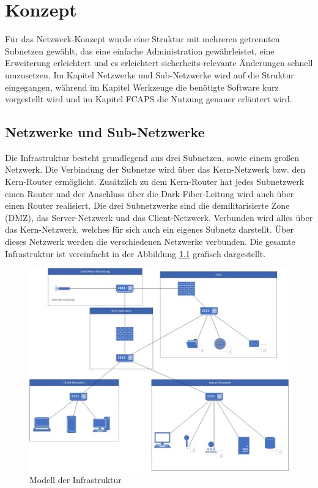 \chapter{Konzept}

Für das Netzwerk-Konzept wurde eine Struktur mit mehreren getrennten Subnetzen gewählt, das eine einfache Administration gewährleistet, eine Erweiterung erleichtert und es erleichtert sicherheits-relevante Änderungen schnell umzusetzen. Im Kapitel Netzwerke und Sub-Netzwerke wird auf die Struktur eingegangen, während im Kapitel Werkzeuge die benötigte Software kurz vorgestellt wird und im Kapitel FCAPS die Nutzung genauer erläutert wird.

\section{Netzwerke und Sub-Netzwerke}
Die Infrastruktur besteht grundlegend aus drei Subnetzen, sowie einem großen Netzwerk. Die Verbindung der Subnetze wird über das Kern-Netzwerk bzw. den Kern-Router ermöglicht. Zusätzlich zu dem Kern-Router hat jedes Subnetzwerk einen Router und der Anschluss über die Dark-Fiber-Leitung wird auch über einen Router realisiert. Die drei Subnetzwerke sind die demilitarisierte Zone (DMZ), das Server-Netzwerk und das Client-Netzwerk.
Verbunden wird alles über das Kern-Netzwerk, welches für sich auch ein eigenes Subnetz darstellt. Über dieses Netzwerk werden die verschiedenen Netzwerke verbunden. Die gesamte Infrastruktur ist vereinfacht in der Abbildung \ref{fig:model} grafisch dargestellt.

\begin{figure}
  \includegraphics[width=\linewidth]{pictures/netzwerk-diagramm.jpg}
  \caption{Modell der Infrastruktur}
  \label{fig:model}
\end{figure}

